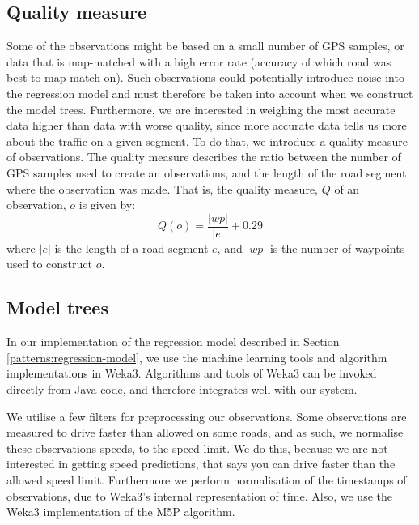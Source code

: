 \subsection{Quality measure}\label{quality-measure}
Some of the observations might be based on a small number of GPS samples, or data that is map-matched with a high error rate (accuracy of which road was best to map-match on). Such observations could potentially introduce noise into the regression model and must therefore be taken into account when we construct the model trees. Furthermore, we are interested in weighing the most accurate data higher than data with worse quality, since more accurate data tells us more about the traffic on a given segment. To do that, we introduce a quality measure of observations. The quality measure describes the ratio between the number of GPS samples used to create an observations, and the length of the road segment where the observation was made. That is, the quality measure, $Q$ of an observation, $o$ is given by:
\begin{equation}
Q(o) = \frac{|wp|}{|e|}+0.29
\end{equation}
where $|e|$ is the length of a road segment $e$, and $|wp|$ is the number of waypoints used to construct $o$.

\subsection{Model trees}\label{patterns:weka}
In our implementation of the regression model described in Section \ref{patterns:regression-model}, we use the machine learning tools and algorithm implementations in Weka3. Algorithms and tools of Weka3 can be invoked directly from Java code, and therefore integrates well with our system.

We utilise a few filters for preprocessing our observations. Some observations are measured to drive faster than allowed on some roads, and as such, we normalise these observations speeds, to the speed limit. We do this, because we are not interested in getting speed predictions, that says you can drive faster than the allowed speed limit. Furthermore we perform normalisation of the timestamps of observations, due to Weka3's internal representation of time. Also, we use the Weka3 implementation of the M5P algorithm.

